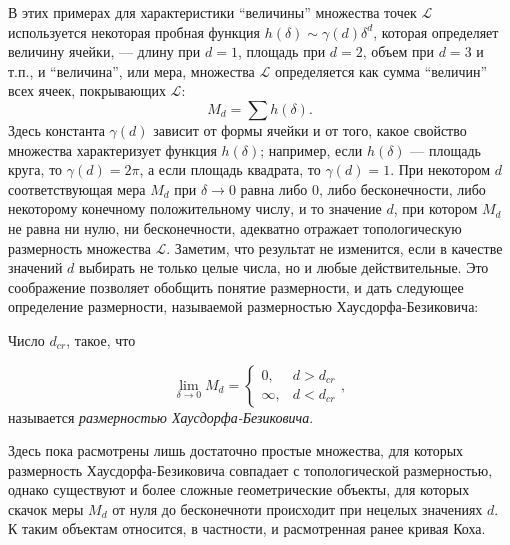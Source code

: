 В этих примерах для характеристики ``величины'' множества точек $\mathcal{L}$ используется некоторая пробная функция $h(\delta) \sim \gamma(d) \delta^{d}$, которая определяет величину ячейки, --- длину при $d = 1$, площадь при $d = 2$, объем при $d = 3$ и т.п., и ``величина'', или мера, множества $\mathcal{L}$ определяется как сумма ``величин'' всех ячеек, покрывающих $\mathcal{L}$:
\begin{equation*}
    M_{d} = \sum h(\delta).
\end{equation*}
Здесь константа $\gamma(d)$ зависит от формы ячейки и от того, какое свойство множества характеризует функция $h(\delta)$; например, если $h(\delta)$ --- площадь круга, то $\gamma(d) = 2 \pi$, а если площадь квадрата, то $\gamma(d) = 1$. При некотором $d$ соответствующая мера $M_{d}$ при $\delta \rightarrow 0$ равна либо 0, либо бесконечности, либо некоторому конечному положительному числу, и то значение $d$, при котором $M_{d}$ не равна ни нулю, ни бесконечности, адекватно отражает топологическую размерность множества $\mathcal{L}$. Заметим, что результат не изменится, если в качестве значений $d$ выбирать не только целые числа, но и любые действительные. Это соображение позволяет обобщить понятие размерности, и дать следующее определение размерности, называемой размерностью Хаусдорфа-Безиковича:
\begin{definition}
    Число $d_{cr}$, такое, что
\end{definition}
\begin{equation*}
    \lim \limits_{\delta \to 0} M_{d} = 
    \begin{cases}
        0, & d > d_{cr}\\
        \infty, & d < d_{cr}
    \end{cases},
\end{equation*}
называется \textit{размерностью Хаусдорфа-Безиковича}.

Здесь пока расмотрены лишь достаточно простые множества, для которых размерность Хаусдорфа-Безиковича совпадает с топологической размерностью, однако существуют и более сложные геометрические объекты, для которых скачок меры $M_{d}$ от нуля до бесконечноти происходит при нецелых значениях $d$. К таким объектам относится, в частности, и расмотренная ранее кривая Коха.

